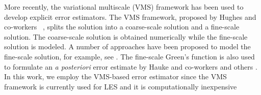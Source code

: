 More recently, the variational multiscale (VMS) framework has been used to develop explicit error estimators. 
The VMS framework, proposed by Hughes and co-workers ~\cite{hughes1995multiscale,hughes1998variational}, splits the solution into a coarse-scale solution and a fine-scale solution. 
The coarse-scale solution is obtained numerically while the fine-scale solution is modeled. 
A number of approaches have been proposed to model the fine-scale solution, for example, see \cite{brezzi1997b,brezzi1992relationship,brezzi1994choosing,codina2002stabilized,hughes2007variational,principe2010stabilization}. 
The fine-scale Green's function is also used to formulate an \textit{a posteriori} error estimate by Hauke and co-workers \cite{hauke2006proper,hauke2006multiscale,hauke2008variational,hauke2012mesh,hauke2014recent,hauke2015variational,irisarri2016posteriori} and others \cite{bayona2018variational}.
In this work, we employ the VMS-based error estimator
since the VMS framework is currently used for LES and it is computationally inexpensive





